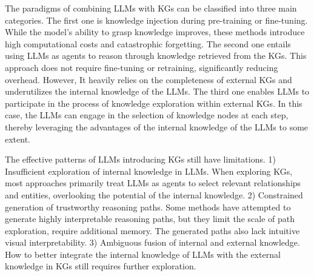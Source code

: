 The paradigms of combining LLMs with KGs can be classified into three main categories. The first one is knowledge injection during pre-training or fine-tuning\cite{rog,re-kbqa,unikgqa,givefact}. While the model's ability to grasp knowledge improves, these methods introduce high computational costs and catastrophic forgetting. 
The second one entails using LLMs as agents to reason through knowledge retrieved from the KGs. This approach does not require fine-tuning or retraining, significantly reducing overhead\cite{structgpt,rag1}. However, It heavily relies on the completeness of external KGs and underutilizes the internal knowledge of the LLMs.
The third one enables LLMs to participate in the process of knowledge exploration within external KGs\cite{tog2}. In this case, the LLMs can engage in the selection of knowledge nodes at each step\cite{tog,pog,gog}, thereby leveraging the advantages of the internal knowledge of the LLMs to some extent.



The effective patterns of LLMs introducing KGs still have limitations.
1) Insufficient exploration of internal knowledge in LLMs.
When exploring KGs, most approaches primarily treat LLMs as agents to select relevant relationships and entities, overlooking the potential of the internal knowledge.
2) Constrained generation of trustworthy reasoning paths. Some methods have attempted to generate highly interpretable reasoning paths, but they limit the scale of path exploration, require additional memory. The generated paths also lack intuitive visual interpretability.
3) Ambiguous fusion of internal and external knowledge. How to better integrate the internal knowledge of LLMs with the external knowledge in KGs still requires further exploration.


